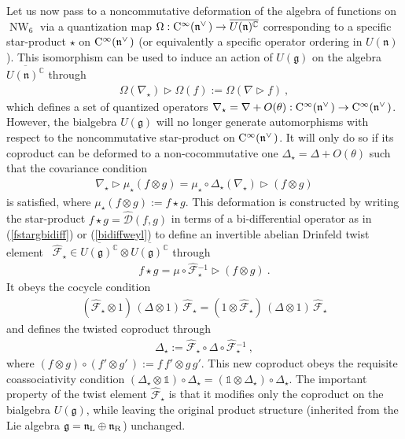 \documentclass[11pt,a4paper]{article}
\DeclareMathOperator{\NW}{NW}
\newcommand{\1}{\mathbb{1}}
\def\one{\mathbb{1}}
\def\CC{{\rm C}}
\def\mfn{{\mathfrak n}}
\def\mfg{{\mathfrak g}}
\newcommand{\complex}{{\mathbb C}} %
\newcommand{\beq}{\begin{eqnarray}}
\newcommand{\eeq}{\end{eqnarray}}
\begin{document}
Let us now pass to a noncommutative deformation of the algebra of
functions on $\NW_6$ via a quantization map
$\Omega:\CC^\infty(\mfn^{\vee\,})\to\overline{U(\mfn)^\complex}$
corresponding to a specific star-product $\star$ on
$\CC^\infty(\mfn^{\vee\,})$ (or equivalently a specific operator ordering in
$U(\mfn)$). This isomorphism can be used to induce an action of
$U(\mfg)$ on the algebra $\overline{U(\mfn)^\complex}$ through
\beq
\Omega(\nabla_\star)\triangleright\Omega(f):=
\Omega(\nabla\triangleright f) \ ,
\label{nablastar}\eeq
which defines a set of quantized operators
$\nabla_\star=\nabla+O(\theta):\CC^\infty(\mfn^{\vee\,})\to\CC^\infty(\mfn^{\vee\,})$.
However, the bialgebra $U(\mfg)$ will no longer generate automorphisms
with respect to the noncommutative star-product on
$\CC^\infty(\mfn^{\vee\,})$. It will only do so if its coproduct can be
deformed to a non-cocommutative one $\Delta_\star=\Delta+O(\theta)$
such that the covariance condition
\beq
\nabla_\star\triangleright\mu_\star(f\otimes g)=\mu_\star\circ
\Delta_\star(\nabla_\star)\triangleright(f\otimes g)
\label{NCcoprodcomp}\eeq
is satisfied, where $\mu_\star(f\otimes g):=f\star g$. This deformation is
constructed by writing the star-product $f\star
g=\hat{\mathcal D}(f,g)$ in terms of a bi-differential operator as in
(\ref{fstargbidiff}) or (\ref{bidiffweyl}) to define an invertible
abelian Drinfeld twist element~\cite{Resh1} $\hat{\mathcal F}_\star\in
\overline{U(\mfg)^\complex}\otimes\overline{U(\mfg)^\complex}$ through
\beq
f\star g=\mu\circ\hat{\mathcal F}{}_\star^{-1}\triangleright(f\otimes
g) \ .
\label{Dtwistdef}\eeq
It obeys the cocycle condition
\beq
(\hat{\mathcal F}_\star\otimes1)\,(\Delta\otimes1)\,\hat
{\mathcal F}_\star=(1\otimes\hat{\mathcal F}_\star)\,
(\Delta\otimes1)\,\hat{\mathcal F}_\star
\label{twistcocycle}\eeq
and defines the twisted coproduct through
\beq
\Delta_\star:=\hat{\mathcal F}_\star^{~}\circ\Delta\circ
\hat{\mathcal F}{}_\star^{-1} \ ,
\label{Deltastardef}\eeq
where $(f\otimes g)\circ(f'\otimes g'\,):=f\,f'\otimes g\,g'$. This new
coproduct obeys the requisite coassociativity condition
$(\Delta_\star\otimes\one)\circ\Delta_\star=(\one\otimes\Delta_\star)
\circ\Delta_\star$. The important property of the twist element
$\hat{\mathcal F}_\star$ is that it modifies only the coproduct on the
bialgebra $U(\mfg)$, while leaving the original product structure
(inherited from the Lie algebra $\mfg=\mfn_{\rm L}\oplus\mfn_{\rm
  R}$) unchanged.
\end{document}
